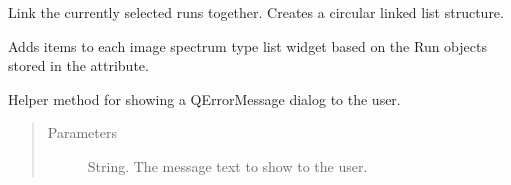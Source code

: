 \documentclass[letterpaper,10pt,english]{sphinxmanual}
\begin{document}
\begin{fulllineitems}
\begin{fulllineitems}
\end{fulllineitems}


\begin{fulllineitems}
\label{\detokenize{polo.windows:polo.windows.spectrum_dialog.SpectrumDialog.link_current_selection}}
Link the currently selected runs together. Creates a circular
linked list structure.

\end{fulllineitems}


\begin{fulllineitems}
\label{\detokenize{polo.windows:polo.windows.spectrum_dialog.SpectrumDialog.populate_list_widgets}}
Adds items to each image spectrum type list widget based on the
Run objects stored in the  attribute.

\end{fulllineitems}


\begin{fulllineitems}
\label{\detokenize{polo.windows:polo.windows.spectrum_dialog.SpectrumDialog.show_error_message}}
Helper method for showing a QErrorMessage dialog to the user.
\begin{quote}\begin{description}
\item[{Parameters}] \leavevmode
{} \textendash{} String. The message text to show to the user.

\end{description}\end{quote}


\end{fulllineitems}
\end{fulllineitems}
\end{document}
